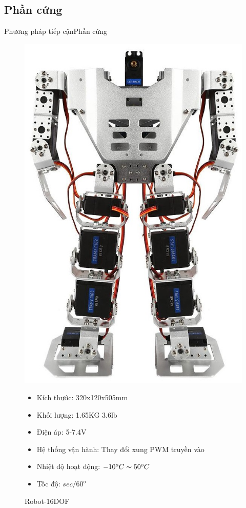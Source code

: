 \documentclass[compress, blue, 13pt,hyperref={pdfpagemode=FullScreen}]{beamer}
\begin{document}
\subsection{Phần cứng}
{
\begin{frame}{Phương pháp tiếp cận}{Phần cứng}
\begin{figure}[hbtp]
\centering
\begin{multicols}{2}
\includegraphics[scale=0.15]{images/01_150_2_1024x1024.jpg}
\columnbreak

\begin{itemize}
\item Kích thước: 320x120x505mm
\item Khối lượng: 1.65KG  3.6lb
\item Điện áp: 5-7.4V
\item Hệ thống vận hành:  Thay đổi xung PWM truyền vào
\item Nhiệt độ hoạt động: $-10^{o}C\thicksim50^{o}C$
\item Tốc độ: $sec/60^{o}$  %
\end{itemize}
\end{multicols}
\caption{Robot-16DOF}
\end{figure}
\end{frame}}
\end{document}

